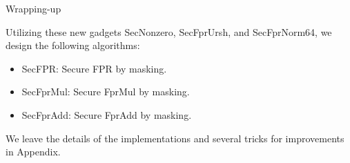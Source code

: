 \begin{frame}{Wrapping-up}

Utilizing these new gadgets {\sf SecNonzero}, {\sf SecFprUrsh}, and {\sf SecFprNorm64}, we design the following algorithms:
\pause
\begin{itemize}
	\item {\sf SecFPR}: Secure FPR by masking.
	\pause
	\item {\sf SecFprMul}: Secure FprMul by masking.
	\pause
	\item {\sf SecFprAdd}: Secure FprAdd by masking.
\end{itemize}
\pause
We leave the details of the implementations and several tricks for improvements in Appendix.

\end{frame}